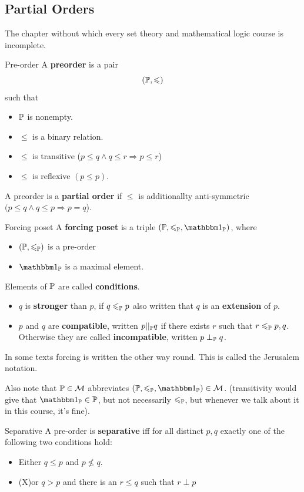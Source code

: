 \documentclass{article}
\begin{document}
\subsection{Partial Orders}
The chapter without which every set theory and mathematical logic course is incomplete.
\begin{fancydefine}{Pre-order}
    A \textbf{preorder} is a pair \[ (\mathbb{P}, \leqslant)\] such that \begin{itemize}
        \item $\mathbb{P}$ is nonempty.
        \item $\leq$ is a binary relation.
        \item $\leq$ is transitive ($p \leq q \wedge q \leq r \Rightarrow p \leq r$)
        \item $\leq$ is reflexive $(p \leq p)$.
    \end{itemize}
    A preorder is a \textbf{partial order} if $\leq$ is additionallty anti-symmetric $( p \leq q \wedge q \leq p \Rightarrow p=q$).
\end{fancydefine}
\begin{fancydefine}{Forcing poset}
    A \textbf{forcing poset} is a triple $(\bbP, \leq_{\bbP}, \bbone_{\bbP})$, where \begin{itemize}
        \item $(\mathbb{P}, \leqslant_{\mathbb{P}})$ is a pre-order
        \item $\bbone_{\bbP}$ is a maximal element.
    \end{itemize}
    Elements of $\mathbb{P}$ are called \textbf{conditions}. \begin{itemize}
        \item $q$ is \textbf{stronger} than $p$, if $q \leqslant_{\mathbb{P}} p$ also written that $q$ is an \textbf{extension} of $p$.
        \item $p$ and $q$ are \textbf{compatible}, written $p ||_{\mathbb{P}} q$ if there exists $r$ such that $r \leqslant_{\mathbb{P}} p,q$. Otherwise they are called \textbf{incompatible}, written $p \perp_{\mathbb{P}} q$.
    \end{itemize}
    In some texts forcing is written the other way round. This is called the Jerusalem notation.
\end{fancydefine}
Also note that $\mathbb{P} \in \mathcal{M}$ abbreviates $(\bbP, \leq_{\bbP}, \bbone_{\bbP}) \in \calM$. (transitivity would give that $\bbone_{\bbP} \in \bbP$, but not necessarily $\leqslant_{\mathbb{P}}$, but whenever we talk about it in this course, it's fine).
\begin{fancydefine}{Separative}
    A pre-order is \textbf{separative} iff for all distinct $p,q$ exactly one of the following two conditions hold: \begin{itemize}
        \item Either $q \leq p$ and $p \nleq q$.
        \item (X)or $q > p$ and there is an $r\leq q$ such that $r \perp p$
    \end{itemize}
\end{fancydefine}
\end{document}

